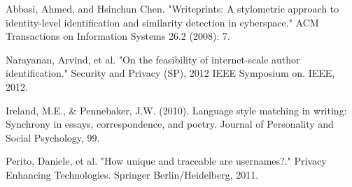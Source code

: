 \documentclass[10pt, conference, compsocconf]{IEEEtran}
\begin{document}
%
%
%
\begin{thebibliography}{1}

Abbasi, Ahmed, and Hsinchun Chen. "Writeprints: A stylometric approach to identity-level identification and similarity detection in cyberspace." ACM Transactions on Information Systems 26.2 (2008): 7.

Narayanan, Arvind, et al. "On the feasibility of internet-scale author identification." Security and Privacy (SP), 2012 IEEE Symposium on. IEEE, 2012.

Ireland, M.E., \& Pennebaker, J.W. (2010).  Language style matching in writing: Synchrony in essays, correspondence, and poetry.  Journal of Personality and Social Psychology, 99.

Perito, Daniele, et al. "How unique and traceable are usernames?." Privacy Enhancing Technologies. Springer Berlin/Heidelberg, 2011.

\end{thebibliography}




\end{document}
